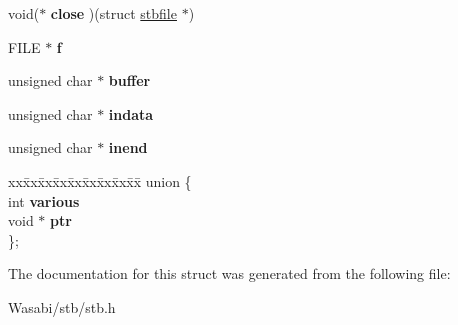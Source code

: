 \begin{DoxyCompactItemize}
\item 
void($\ast$ {\bfseries close} )(struct \hyperlink{structstbfile}{stbfile} $\ast$)\hypertarget{structstbfile_a679a9ecac781319a64233e288b7eb01c}{}\label{structstbfile_a679a9ecac781319a64233e288b7eb01c}

\item 
F\+I\+LE $\ast$ {\bfseries f}\hypertarget{structstbfile_a91017b6da0df48236f4429f969ce4561}{}\label{structstbfile_a91017b6da0df48236f4429f969ce4561}

\item 
unsigned char $\ast$ {\bfseries buffer}\hypertarget{structstbfile_a6c9a517bfb3193e0fc639b1ab0ebc73c}{}\label{structstbfile_a6c9a517bfb3193e0fc639b1ab0ebc73c}

\item 
unsigned char $\ast$ {\bfseries indata}\hypertarget{structstbfile_a36540b43ac85dbdecc23d01a52dac98e}{}\label{structstbfile_a36540b43ac85dbdecc23d01a52dac98e}

\item 
unsigned char $\ast$ {\bfseries inend}\hypertarget{structstbfile_a454a15213fe6223ed65a693012cba615}{}\label{structstbfile_a454a15213fe6223ed65a693012cba615}

\item 
\begin{tabbing}
xx\=xx\=xx\=xx\=xx\=xx\=xx\=xx\=xx\=\kill
union \{\\
\>int {\bfseries various}\\
\>void $\ast$ {\bfseries ptr}\\
\}; \hypertarget{structstbfile_a3948be22df7786b60db36a002f093b55}{}\label{structstbfile_a3948be22df7786b60db36a002f093b55}
\\

\end{tabbing}\end{DoxyCompactItemize}


The documentation for this struct was generated from the following file\+:\begin{DoxyCompactItemize}
\item 
Wasabi/stb/stb.\+h\end{DoxyCompactItemize}
